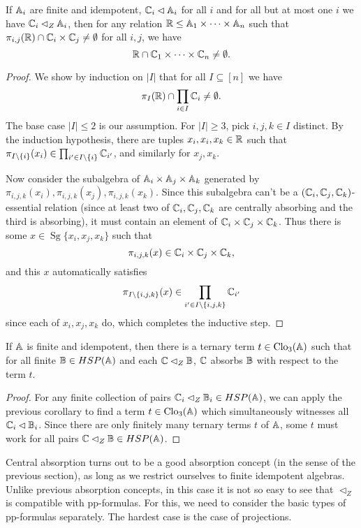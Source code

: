\documentclass[letterpaper,11pt]{article}
\DeclareMathOperator{\Clo}{Clo}
\DeclareMathOperator{\Sg}{Sg}
\begin{document}
\begin{cor} If $\mathbb{A}_i$ are finite and idempotent, $\mathbb{C}_i \lhd \mathbb{A}_i$ for all $i$ and for all but at most one $i$ we have $\mathbb{C}_i \lhd_Z \mathbb{A}_i$, then for any relation $\mathbb{R} \le \mathbb{A}_1 \times \cdots \times \mathbb{A}_n$ such that $\pi_{i,j}(\mathbb{R}) \cap \mathbb{C}_i \times \mathbb{C}_j \ne \emptyset$ for all $i,j$, we have
\[
\mathbb{R} \cap \mathbb{C}_1 \times \cdots \times \mathbb{C}_n \ne \emptyset.
\]
\end{cor}
\begin{proof} We show by induction on $|I|$ that for all $I \subseteq [n]$ we have
\[
\pi_I(\mathbb{R}) \cap \prod_{i \in I} \mathbb{C}_i \ne \emptyset.
\]
The base case $|I| \le 2$ is our assumption. For $|I| \ge 3$, pick $i,j,k \in I$ distinct. By the induction hypothesis, there are tuples $x_i, x_i, x_k \in \mathbb{R}$ such that $\pi_{I\setminus\{i\}}(x_i) \in \prod_{i' \in I \setminus\{i\}} \mathbb{C}_{i'}$, and similarly for $x_j,x_k$.

Now consider the subalgebra of $\mathbb{A}_i\times \mathbb{A}_j \times \mathbb{A}_k$ generated by $\pi_{i,j,k}(x_i), \pi_{i,j,k}(x_j), \pi_{i,j,k}(x_k)$. Since this subalgebra can't be a $(\mathbb{C}_i,\mathbb{C}_j,\mathbb{C}_k)$-essential relation (since at least two of $\mathbb{C}_i,\mathbb{C}_j,\mathbb{C}_k$ are centrally absorbing and the third is absorbing), it must contain an element of $\mathbb{C}_i\times\mathbb{C}_j\times\mathbb{C}_k$. Thus there is some $x \in \Sg\{x_i,x_j,x_k\}$ such that
\[
\pi_{i,j,k}(x) \in \mathbb{C}_i\times\mathbb{C}_j\times\mathbb{C}_k,
\]
and this $x$ automatically satisfies
\[
\pi_{I\setminus\{i,j,k\}}(x) \in \prod_{i' \in I\setminus\{i,j,k\}} \mathbb{C}_{i'}
\]
since each of $x_i, x_j, x_k$ do, which completes the inductive step.
\end{proof}

\begin{cor} If $\mathbb{A}$ is finite and idempotent, then there is a ternary term $t \in \Clo_3(\bA)$ such that for all finite $\mathbb{B} \in HSP(\mathbb{A})$ and each $\mathbb{C} \lhd_Z \mathbb{B}$, $\mathbb{C}$ absorbs $\mathbb{B}$ with respect to the term $t$.
\end{cor}
\begin{proof} For any finite collection of pairs $\mathbb{C}_i \lhd_Z \mathbb{B}_i \in HSP(\mathbb{A})$, we can apply the previous corollary to find a term $t \in \Clo_3(\bA)$ which simultaneously witnesses all $\mathbb{C}_i \lhd \mathbb{B}_i$. Since there are only finitely many ternary terms $t$ of $\mathbb{A}$, some $t$ must work for all pairs $\mathbb{C} \lhd_Z \mathbb{B} \in HSP(\mathbb{A})$.
\end{proof}

Central absorption turns out to be a good absorption concept (in the sense of the previous section), as long as we restrict ourselves to finite idempotent algebras. Unlike previous absorption concepts, in this case it is not so easy to see that $\lhd_Z$ is compatible with pp-formulas. For this, we need to consider the basic types of pp-formulas separately. The hardest case is the case of projections.
\end{document}
